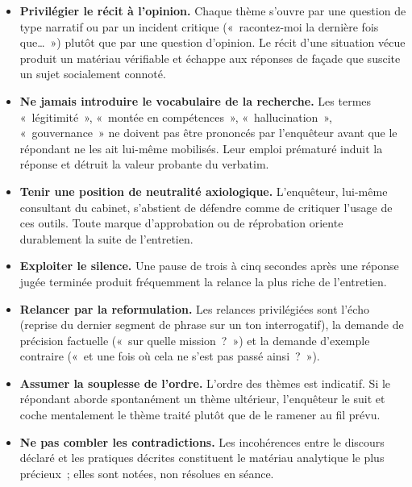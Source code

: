 \begin{itemize}
    \item \textbf{Privilégier le récit à l'opinion.} Chaque thème s'ouvre par une
    question de type narratif ou par un incident critique («~racontez-moi la
    dernière fois que…~») plutôt que par une question d'opinion. Le récit d'une
    situation vécue produit un matériau vérifiable et échappe aux réponses de
    façade que suscite un sujet socialement connoté.

    \item \textbf{Ne jamais introduire le vocabulaire de la recherche.} Les termes
    «~légitimité~», «~montée en compétences~», «~hallucination~», «~gouvernance~»
    ne doivent pas être prononcés par l'enquêteur avant que le répondant ne les ait
    lui-même mobilisés. Leur emploi prématuré induit la réponse et détruit la valeur
    probante du verbatim.

    \item \textbf{Tenir une position de neutralité axiologique.} L'enquêteur, lui-même
    consultant du cabinet, s'abstient de défendre comme de critiquer l'usage de ces
    outils. Toute marque d'approbation ou de réprobation oriente durablement la suite
    de l'entretien.

    \item \textbf{Exploiter le silence.} Une pause de trois à cinq secondes après une
    réponse jugée terminée produit fréquemment la relance la plus riche de l'entretien.

    \item \textbf{Relancer par la reformulation.} Les relances privilégiées sont
    l'écho (reprise du dernier segment de phrase sur un ton interrogatif), la demande
    de précision factuelle («~sur quelle mission~?~») et la demande d'exemple
    contraire («~et une fois où cela ne s'est pas passé ainsi~?~»).

    \item \textbf{Assumer la souplesse de l'ordre.} L'ordre des thèmes est indicatif.
    Si le répondant aborde spontanément un thème ultérieur, l'enquêteur le suit et
    coche mentalement le thème traité plutôt que de le ramener au fil prévu.

    \item \textbf{Ne pas combler les contradictions.} Les incohérences entre le
    discours déclaré et les pratiques décrites constituent le matériau analytique le
    plus précieux~; elles sont notées, non résolues en séance.
\end{itemize}

